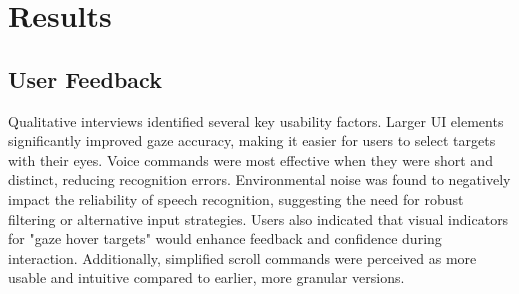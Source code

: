%
%
%
%


\section{Results}

\subsection{User Feedback}

Qualitative interviews identified several key usability factors. Larger UI elements significantly improved gaze accuracy, making it easier for users to select targets with their eyes. Voice commands were most effective when they were short and distinct, reducing recognition errors. Environmental noise was found to negatively impact the reliability of speech recognition, suggesting the need for robust filtering or alternative input strategies. Users also indicated that visual indicators for "gaze hover targets" would enhance feedback and confidence during interaction. Additionally, simplified scroll commands were perceived as more usable and intuitive compared to earlier, more granular versions.

